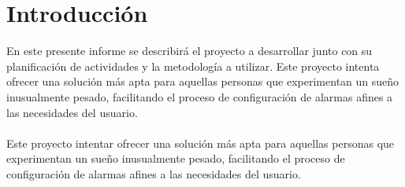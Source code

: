 \section{Introducción}

En este presente informe se describirá el proyecto a desarrollar junto con su planificación de actividades y la metodología a utilizar. Este proyecto intenta ofrecer una solución más apta para aquellas personas que experimentan un sueño inusualmente pesado, facilitando el proceso de configuración de alarmas afines a las necesidades del usuario.
\\\\
Este proyecto intentar ofrecer una solución más apta para aquellas personas que experimentan un sueño inusualmente pesado, facilitando el proceso de configuración de alarmas afines a las necesidades del usuario.

